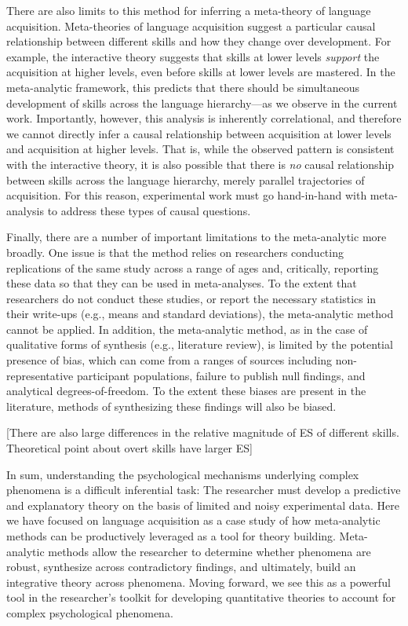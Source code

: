 \documentclass[english,floatsintext,man]{apa6}
\begin{document}
There are also limits to this method for inferring a meta-theory of
language acquisition. Meta-theories of language acquisition suggest a
particular causal relationship between different skills and how they
change over development. For example, the interactive theory suggests
that skills at lower levels \emph{support} the acquisition at higher
levels, even before skills at lower levels are mastered. In the
meta-analytic framework, this predicts that there should be simultaneous
development of skills across the language hierarchy---as we observe in
the current work. Importantly, however, this analysis is inherently
correlational, and therefore we cannot directly infer a causal
relationship between acquisition at lower levels and acquisition at
higher levels. That is, while the observed pattern is consistent with
the interactive theory, it is also possible that there is \emph{no}
causal relationship between skills across the language hierarchy, merely
parallel trajectories of acquisition. For this reason, experimental work
must go hand-in-hand with meta-analysis to address these types of causal
questions.

Finally, there are a number of important limitations to the
meta-analytic more broadly. One issue is that the method relies on
researchers conducting replications of the same study across a range of
ages and, critically, reporting these data so that they can be used in
meta-analyses. To the extent that researchers do not conduct these
studies, or report the necessary statistics in their write-ups (e.g.,
means and standard deviations), the meta-analytic method cannot be
applied. In addition, the meta-analytic method, as in the case of
qualitative forms of synthesis (e.g., literature review), is limited by
the potential presence of bias, which can come from a ranges of sources
including non-representative participant populations, failure to publish
null findings, and analytical degrees-of-freedom. To the extent these
biases are present in the literature, methods of synthesizing these
findings will also be biased.

{[}There are also large differences in the relative magnitude of ES of
different skills. Theoretical point about overt skills have larger ES{]}

In sum, understanding the psychological mechanisms underlying complex
phenomena is a difficult inferential task: The researcher must develop a
predictive and explanatory theory on the basis of limited and noisy
experimental data. Here we have focused on language acquisition as a
case study of how meta-analytic methods can be productively leveraged as
a tool for theory building. Meta-analytic methods allow the researcher
to determine whether phenomena are robust, synthesize across
contradictory findings, and ultimately, build an integrative theory
across phenomena. Moving forward, we see this as a powerful tool in the
researcher's toolkit for developing quantitative theories to account for
complex psychological phenomena.
\end{document}
